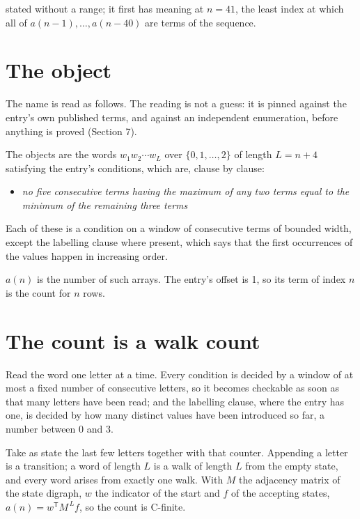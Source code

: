 \documentclass[11pt]{article}
\theoremstyle{definition}
\begin{document}
stated without a range; it first has meaning at $n = 41$, the least index at which all of $a(n-1),\dots,a(n-40)$ are terms of the sequence.

\section{The object}

The name is read as follows. The reading is not a guess: it is pinned against the entry's own published terms, and against an independent enumeration, before anything is proved (Section 7).

The objects are the words $w_1 w_2 \cdots w_L$ over $\{0,1,\dots,2\}$ of length $L = n + 4$ satisfying the entry's conditions, which are, clause by clause:

\begin{itemize}

\item {\itshape no five consecutive terms having the maximum of any two terms equal to the minimum of the remaining three terms}

\end{itemize}

Each of these is a condition on a window of consecutive terms of bounded width, except the labelling clause where present, which says that the first occurrences of the values happen in increasing order.

$a(n)$ is the number of such arrays. The entry's offset is 1, so its term of index $n$ is the count for $n$ rows.

\section{The count is a walk count}

Read the word one letter at a time. Every condition is decided by a window of at most a fixed number of consecutive letters, so it becomes checkable as soon as that many letters have been read; and the labelling clause, where the entry has one, is decided by how many distinct values have been introduced so far, a number between $0$ and 3.

Take as state the last few letters together with that counter. Appending a letter is a transition; a word of length $L$ is a walk of length $L$ from the empty state, and every word arises from exactly one walk. With $M$ the adjacency matrix of the state digraph, $w$ the indicator of the start and $f$ of the accepting states, $a(n) = w^{\mathsf T}M^{\,L}f$, so the count is C-finite.
\end{document}
